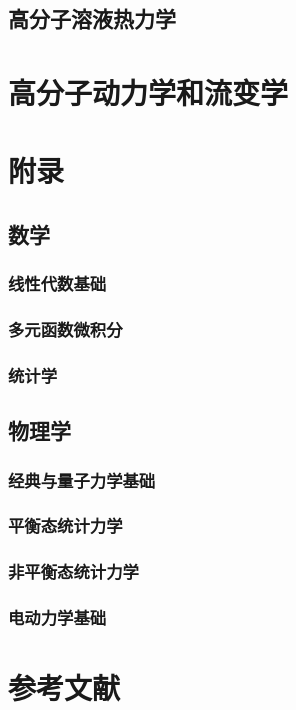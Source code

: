 \documentclass[zihao=5,linespread=1.3,a4paper,heading=true,twoside]{ctexbook}
\theoremstyle{definition}
\theoremstyle{plain}
\begin{document}
\chapter{高分子溶液热力学}


\part{高分子动力学和流变学}

\part{附录}
\chapter{数学}
\section{线性代数基础}
\section{多元函数微积分}
\section{统计学}

\chapter{物理学}
\section{经典与量子力学基础}
\section{平衡态统计力学}

\section{非平衡态统计力学}
\section{电动力学基础}



\newpage\part*{参考文献}
\printbibliography[heading=none]
\end{document}

